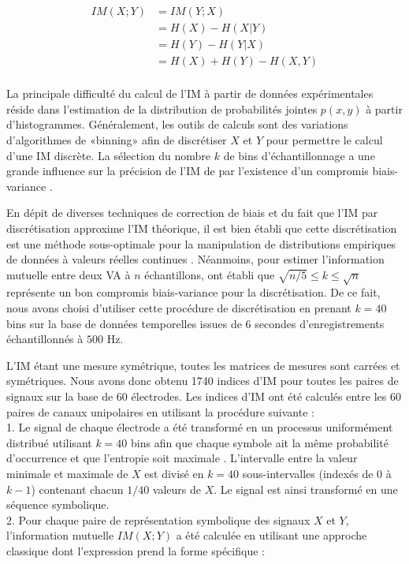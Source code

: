 \begin{equation}
\begin{split}
IM(X;Y) &= IM(Y;X) \\
&= H(X) - H(X|Y) \\ 
&= H(Y) - H(Y|X) \\ 
&= H(X) + H(Y) - H(X,Y) \\ 
\end{split}
\end{equation}

La principale difficulté du calcul de l'IM à partir de données expérimentales réside dans l'estimation de la distribution de probabilités jointes $p(x,y)$ à partir d'histogrammes. 
Généralement, les outils de calculs sont des variations d'algorithmes de «binning» afin de discrétiser $X$ et $Y$ pour permettre le calcul d'une IM discrète. 
La sélection du nombre $k$ de bins d'échantillonnage a une grande influence sur la précision de l'IM de par l'existence d'un compromis biais-variance \citep{hlavavckova2007causality, ince2017statistical, jeong2001mutual, sun2018mutual}. 

En dépit de diverses techniques de correction de biais \citep{paninski2003estimation, schurmann1996entropy} et du fait que l'IM par discrétisation approxime l'IM théorique, il est bien établi que cette discrétisation est une méthode sous-optimale pour la manipulation de distributions empiriques de données à valeurs réelles continues \citep{budden2016information, ross2014mutual, roulston1999estimating, seok2015mutual}. 
Néanmoins, pour estimer l'information mutuelle entre deux VA à $n$ échantillons, \cite{hlavavckova2007causality} ont établi que $\sqrt{n/5} \leq k \leq \sqrt{n}$ représente un bon compromis biais-variance pour la discrétisation. 
De ce fait, nous avons choisi d'utiliser cette procédure de discrétisation en prenant $k=40$ bins sur la base de données temporelles issues de $6$ secondes d'enregistrements échantillonnés à $500$ Hz. 

L'IM étant une mesure symétrique, toutes les matrices de mesures sont carrées et symétriques. 
Nous avons donc obtenu 1740 indices d'IM pour toutes les paires de signaux sur la base de 60 électrodes. 
Les indices d'IM ont été calculés entre les 60 paires de canaux unipolaires en utilisant la procédure suivante :\\
1. Le signal de chaque électrode a été transformé en un processus uniformément distribué utilisant $k=40$ bins afin que chaque symbole ait la même probabilité d'occurrence et que l'entropie soit maximale \citep{hlavavckova2007causality}. 
L'intervalle entre la valeur minimale et maximale de $X$ est divisé en $k=40$ sous-intervalles (indexés de $0$ à $k-1$) contenant chacun $1/40$ valeurs de $X$. 
Le signal est ainsi transformé en une séquence symbolique.\\
2. Pour chaque paire de représentation symbolique des signaux $X$ et $Y$, l'information mutuelle $IM(X;Y)$ a été calculée en utilisant une approche classique \citep{studholme1998normalized} dont l'expression prend la forme spécifique :

